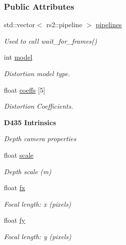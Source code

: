 \subsubsection*{Public Attributes}
\begin{DoxyCompactItemize}
\item 
std\+::vector$<$ rs2\+::pipeline $>$ \hyperlink{classCamera_a689d4141375d8f7fbf1651338c1ea9c0}{pipelines}
\begin{DoxyCompactList}\small\item\em Used to call wait\+\_\+for\+\_\+frames() \end{DoxyCompactList}\item 
int \hyperlink{classCamera_a3061c56d262cab256468f05b9d8838fc}{model}
\begin{DoxyCompactList}\small\item\em Distortion model type. \end{DoxyCompactList}\item 
float \hyperlink{classCamera_af6b42da84223170eb6434a3df1d677af}{coeffs} \mbox{[}5\mbox{]}
\begin{DoxyCompactList}\small\item\em Distortion Coefficients. \end{DoxyCompactList}\end{DoxyCompactItemize}
\begin{Indent}{\bf D435 Intrinsics}\par
{\em Depth camera properties }\begin{DoxyCompactItemize}
\item 
float \hyperlink{classCamera_a50152f7c8f2ce7601dd6086c90b3a65c}{scale}
\begin{DoxyCompactList}\small\item\em Depth scale (m) \end{DoxyCompactList}\item 
float \hyperlink{classCamera_a4f5e789525c1c9306028c080922582e2}{fx}
\begin{DoxyCompactList}\small\item\em Focal length\+: x (pixels) \end{DoxyCompactList}\item 
float \hyperlink{classCamera_a1472650e23f3df5f23dda7f94537e889}{fy}
\begin{DoxyCompactList}\small\item\em Focal length\+: y (pixels) \end{DoxyCompactList}\end{DoxyCompactItemize}
\end{Indent}
